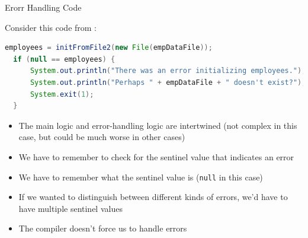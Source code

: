 \documentclass{beamer}
\begin{document}
\begin{frame}
  \titlepage
\end{frame}

\begin{frame}[fragile]{Erorr Handling Code}

Consider this code from :
\begin{lstlisting}[language=Java]
  employees = initFromFile2(new File(empDataFile));
  if (null == employees) {
      System.out.println("There was an error initializing employees.");
      System.out.println("Perhaps " + empDataFile + " doesn't exist?");
      System.exit(1);
  }
\end{lstlisting}

\begin{itemize}
\item The main logic and error-handling logic are intertwined (not complex in this case, but could be much worse in other cases)
\item We have to remember to check for the sentinel value that indicates an error
\item We have to remember what the sentinel value is ({\tt null} in this case)
\item If we wanted to distinguish between different kinds of errors, we'd have to have multiple sentinel values
\item The compiler doesn't force us to handle errors
\end{itemize}


\end{frame}
\end{document}

